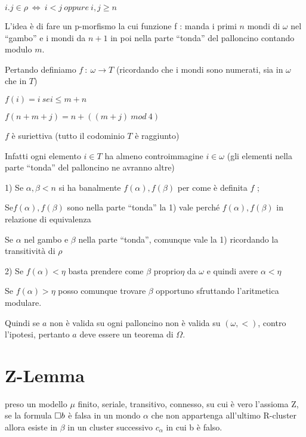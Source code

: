 $i.j\in\rho\ \iff\ i<j\ oppure\ i,j\geq n$ 

L'idea è di fare un p-morfismo la cui funzione f : manda i primi $n$
mondi di $\omega$ nel ``gambo'' e i mondi da $n+1$ in poi nella
parte ``tonda'' del palloncino contando modulo $m$.

Pertando definiamo $f\ :\ \omega\rightarrow T$ (ricordando che i
mondi sono numerati, sia in $\omega$ che in $T$)

$f(i)=i\ se$$i\leq m+n$

$f(n+m+j)=n+((m+j)\ mod\ 4)$

$f$ è suriettiva (tutto il codominio $T$ è raggiunto)

Infatti ogni elemento $i\in T$ ha almeno controimmagine $i\in\omega$
(gli elementi nella parte ``tonda'' del palloncino ne avranno altre)


1) Se $\alpha,\beta<n$ si ha banalmente $f(\alpha),f(\beta)$ per
come è definita $f$ ;

Se$f(\alpha),f(\beta)$ sono nella parte ``tonda'' la 1) vale perché
$f(\alpha),f(\beta)$ in relazione di equivalenza

Se $\alpha$ nel gambo e $\beta$ nella parte ``tonda'', comunque
vale la 1) ricordando la transitività di $\rho$

2) Se $f(\alpha)<\eta$ basta prendere come $\beta$ proprio$\eta$
da $\omega$ e quindi avere $\alpha<\eta$

Se $f(\alpha)>\eta$ posso comunque trovare \textbf{$\beta$ }opportuno
sfruttando l'aritmetica modulare.



Quindi se $a$ non è valida su ogni palloncino non è valida su $(\omega,<)$,
contro l’ipotesi, pertanto $a$ deve essere un teorema di $\Omega$.


\section{Z-Lemma}

preso un modello $\mu$ finito, seriale, transitivo, connesso, su
cui è vero l'assioma Z, se la formula $\square b$ è falsa in un mondo
$\alpha$ che non appartenga all'ultimo R-cluster allora esiste in
$\beta$ in un cluster successivo $c_{\alpha}$ in cui b è falso.

